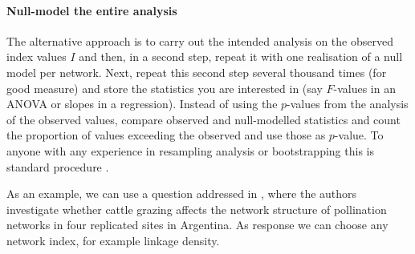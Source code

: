 \documentclass[a4paper, 11pt]{article}
\newcommand{\ind}[1]{#1\index{#1}}           			   %
\begin{document}
\paragraph{Null-model the entire analysis}
The alternative approach is to carry out the intended analysis on the observed index values $I$ and then, in a second step, repeat it with one realisation of a null model per network. Next, repeat this second step several thousand times (for good measure) and store the statistics you are interested in (say $F$-values in an ANOVA or slopes in a regression). Instead of using the $p$-values from the analysis of the observed values, compare observed and null-modelled statistics and count the proportion of values exceeding the observed and use those as $p$-value. To anyone with any experience in \ind{resampling analysis} or bootstrapping this is standard procedure \citep{Efron1993,Manly1997}.

As an example, we can use a question addressed in \citet{Vazquez2003}, where the authors investigate whether cattle grazing affects the network structure of pollination networks in four replicated sites in Argentina. As response we can choose any network index, for example linkage density. %
\end{document}
